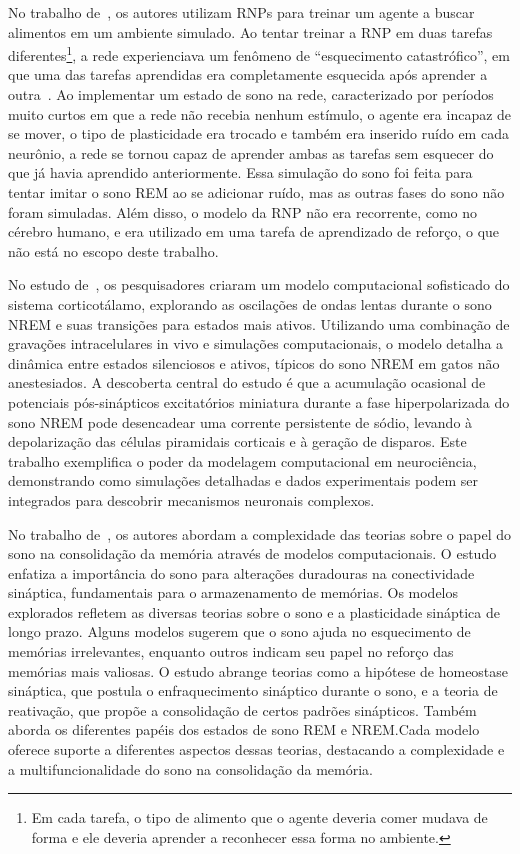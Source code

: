 No trabalho de~, os autores utilizam RNPs para treinar um agente a buscar alimentos em um ambiente
simulado. Ao tentar treinar a RNP em duas tarefas diferentes\footnote{Em cada tarefa, o tipo de alimento que o agente deveria
comer mudava de forma e ele deveria aprender a reconhecer essa forma no ambiente.}, a rede experienciava um fenômeno de
``esquecimento catastrófico'', em que uma das tarefas aprendidas era completamente esquecida após aprender a
outra~\cite{hasselmoAvoiding2017}. Ao implementar um estado de sono na rede, caracterizado por períodos muito curtos em que a rede
não recebia nenhum estímulo, o agente era incapaz de se mover, o tipo de plasticidade era trocado e também era inserido ruído em
cada neurônio, a rede se tornou capaz de aprender ambas as tarefas sem esquecer do que já havia aprendido anteriormente. Essa
simulação do sono foi feita para tentar imitar o sono REM ao se adicionar ruído, mas as outras fases do sono não foram simuladas.
Além disso, o modelo da RNP não era recorrente, como no cérebro humano, e era utilizado em uma tarefa de aprendizado de reforço, o
que não está no escopo deste trabalho.

No estudo de~, os pesquisadores criaram um modelo computacional sofisticado do sistema
corticotálamo, explorando as oscilações de ondas lentas durante o sono NREM e suas transições para estados mais ativos. Utilizando
uma combinação de gravações intracelulares in vivo e simulações computacionais, o modelo detalha a dinâmica entre estados
silenciosos e ativos, típicos do sono NREM em gatos não anestesiados. A descoberta central do estudo é que a acumulação ocasional
de potenciais pós-sinápticos excitatórios miniatura durante a fase hiperpolarizada do sono NREM pode desencadear uma corrente
persistente de sódio, levando à depolarização das células piramidais corticais e à geração de disparos. Este trabalho exemplifica
o poder da modelagem computacional em neurociência, demonstrando como simulações detalhadas e dados experimentais podem ser
integrados para descobrir mecanismos neuronais complexos.

No trabalho de~, os autores abordam a complexidade das teorias sobre o papel do sono na
consolidação da memória através de modelos computacionais. O estudo enfatiza a importância do sono para alterações duradouras na
conectividade sináptica, fundamentais para o armazenamento de memórias. Os modelos explorados refletem as diversas teorias sobre o
sono e a plasticidade sináptica de longo prazo. Alguns modelos sugerem que o sono ajuda no esquecimento de memórias irrelevantes,
enquanto outros indicam seu papel no reforço das memórias mais valiosas. O estudo abrange teorias como a hipótese de homeostase
sináptica, que postula o enfraquecimento sináptico durante o sono, e a teoria de reativação, que propõe a consolidação de certos
padrões sinápticos. Também aborda os diferentes papéis dos estados de sono REM e NREM.\@ Cada modelo oferece suporte a diferentes
aspectos dessas teorias, destacando a complexidade e a multifuncionalidade do sono na consolidação da memória.

